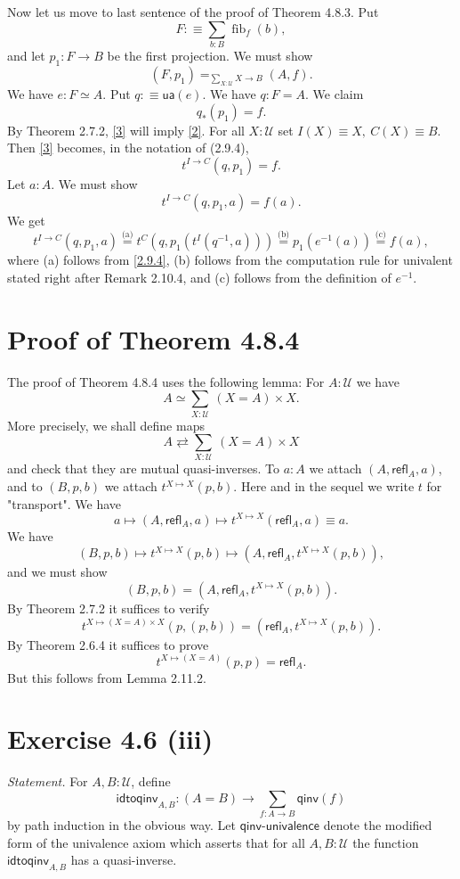 \documentclass[12pt]{article}
\newcommand{\oo}{\operatorname}
\newcommand{\refl}{\mathsf{refl}}
\newcommand{\U}{\mathcal U}
\newcommand{\ua}{\mathsf{ua}}
\begin{document}
Now let us move to last sentence of the proof of Theorem 4.8.3. Put
$$
F:\equiv\sum_{b:B}\oo{fib}_f(b),
$$ 
and let $p_1:F\to B$ be the first projection. We must show 
\begin{equation}\label{2}
(F,p_1)=_{\sum_{X:\U}X\to B}(A,f).
\end{equation} 
We have $e:F\simeq A$. Put $q:\equiv\ua(e)$. We have $q:F=A$. We claim 
\begin{equation}\label{3}
q_*(p_1)=f.
\end{equation} 
By Theorem 2.7.2, \eqref{3} will imply \eqref{2}. For all $X:\U$ set $I(X)\equiv X,\ C(X)\equiv B$. Then \eqref{3} becomes, in the notation of (2.9.4), 
$$
t^{I\to C}(q,p_1)=f.
$$ 
Let $a:A$. We must show 
$$
t^{I\to C}(q,p_1,a)=f(a).
$$ 
We get 
$$
t^{I\to C}(q,p_1,a)\overset{\text{(a)}}=t^C(q,p_1(t^I(q^{-1},a)))\overset{\text{(b)}}=p_1(e^{-1}(a))\overset{\text{(c)}}=f(a),
$$ 
where (a) follows from \eqref{2.9.4}, (b) follows from the computation rule for univalent stated right after Remark 2.10.4, and (c) follows from the definition of $e^{-1}$.


\section{Proof of Theorem 4.8.4}

The proof of Theorem 4.8.4 uses the following lemma: For $A:\U$ we have 
$$
A\simeq\sum_{X:\U}\ (X=A)\times X.
$$
More precisely, we shall define maps 
$$
A\rightleftarrows\sum_{X:\U}\ (X=A)\times X
$$ 
and check that they are mutual quasi-inverses. To $a:A$ we attach $(A,\refl_A,a)$, and to $(B,p,b)$ we attach $t^{X\mapsto X}(p,b)$. Here and in the sequel we write $t$ for "transport". We have 
$$
a\mapsto(A,\refl_A,a)\mapsto t^{X\mapsto X}(\refl_A,a)\equiv a.
$$ 
We have 
$$
(B,p,b)\mapsto t^{X\mapsto X}(p,b)\mapsto(A,\refl_A,t^{X\mapsto X}(p,b)),
$$ 
and we must show 
$$
(B,p,b)=(A,\refl_A,t^{X\mapsto X}(p,b)).
$$ 
By Theorem 2.7.2 it suffices to verify 
$$
t^{X\mapsto (X=A)\times X}(p,(p,b))=(\refl_A,t^{X\mapsto X}(p,b)).
$$ 
By Theorem 2.6.4 it suffices to prove 
$$
t^{X\mapsto (X=A)}(p,p)=\refl_A.
$$ 
But this follows from Lemma 2.11.2.


\section{Exercise 4.6 (iii)}

\emph{Statement.} For $A,B:\mathcal U$, define
$$
\mathsf{idtoqinv}_{A,B}:(A=B)\to\sum_{f:A\to B}\mathsf{qinv}(f)
$$
by path induction in the obvious way. Let $\mathsf{qinv}$-$\mathsf{univalence}$ denote the modified form of the univalence axiom which asserts that for all $A,B:\mathcal U$ the function $\mathsf{idtoqinv}_{A,B}$ has a quasi-inverse.
\end{document}
